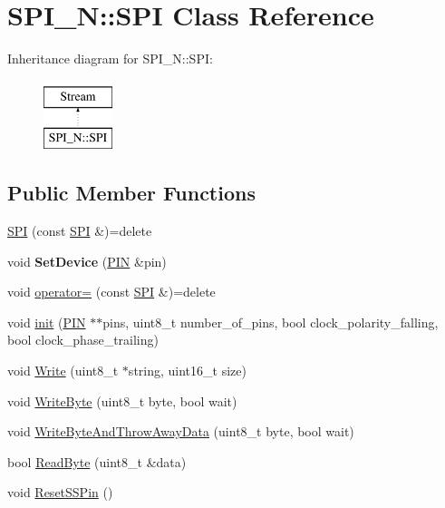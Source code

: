 \hypertarget{class_s_p_i___n_1_1_s_p_i}{}\section{S\+P\+I\+\_\+N\+:\+:S\+PI Class Reference}
\label{class_s_p_i___n_1_1_s_p_i}
Inheritance diagram for S\+P\+I\+\_\+N\+:\+:S\+PI\+:\begin{figure}[H]
\begin{center}
\leavevmode
\includegraphics[height=2.000000cm]{class_s_p_i___n_1_1_s_p_i}
\end{center}
\end{figure}
\subsection*{Public Member Functions}
\begin{DoxyCompactItemize}
\item 
\hyperlink{class_s_p_i___n_1_1_s_p_i_ab486ba0f0d9ec880520e568762cc6c7d}{S\+PI} (const \hyperlink{class_s_p_i___n_1_1_s_p_i}{S\+PI} \&)=delete
\item 
\hypertarget{class_s_p_i___n_1_1_s_p_i_ad04a79c8e9139545a96af71245ce8d18}{}\label{class_s_p_i___n_1_1_s_p_i_ad04a79c8e9139545a96af71245ce8d18} 
void {\bfseries Set\+Device} (\hyperlink{struct_s_p_i___n_1_1_p_i_n}{P\+IN} \&pin)
\item 
void \hyperlink{class_s_p_i___n_1_1_s_p_i_aabc66612d396c2b70e5cbdba405dbfe5}{operator=} (const \hyperlink{class_s_p_i___n_1_1_s_p_i}{S\+PI} \&)=delete
\item 
void \hyperlink{class_s_p_i___n_1_1_s_p_i_a9812909f119712e57e2d452b859509ee}{init} (\hyperlink{struct_s_p_i___n_1_1_p_i_n}{P\+IN} $\ast$$\ast$pins, uint8\+\_\+t number\+\_\+of\+\_\+pins, bool clock\+\_\+polarity\+\_\+falling, bool clock\+\_\+phase\+\_\+trailing)
\item 
void \hyperlink{class_s_p_i___n_1_1_s_p_i_a3e2e2a7f02ffa5003548a1b9d820ce9a}{Write} (uint8\+\_\+t $\ast$string, uint16\+\_\+t size)
\item 
void \hyperlink{class_s_p_i___n_1_1_s_p_i_a542dc8e88203de7040ce9926d06b9463}{Write\+Byte} (uint8\+\_\+t byte, bool wait)
\item 
void \hyperlink{class_s_p_i___n_1_1_s_p_i_a05bcca2e033422b2e6ad570320d03fcb}{Write\+Byte\+And\+Throw\+Away\+Data} (uint8\+\_\+t byte, bool wait)
\item 
bool \hyperlink{class_s_p_i___n_1_1_s_p_i_a57ee9af74ec6a2d37001674f37f46344}{Read\+Byte} (uint8\+\_\+t \&data)
\item 
void \hyperlink{class_s_p_i___n_1_1_s_p_i_a6daa4720c8710e177f71ac318b96a3f8}{Reset\+S\+S\+Pin} ()
\end{DoxyCompactItemize}
